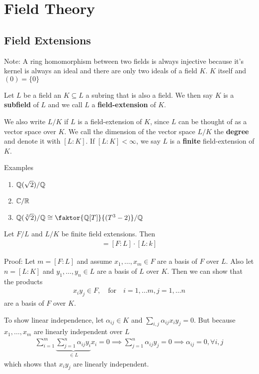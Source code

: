 \section{Field Theory}
\subsection{Field Extensions}
Note: A ring homomorphism between two fields is always injective because it's kernel is always an ideal and there are only two ideals of a field $K$.
$K$ itself and $(0) = \{0\}$

\begin{definition}[]
	Let $L$ be a field an $K \subseteq L$ a subring that is also a field. We then say $K$ is a \textbf{subfield} of $L$ and we call $L$ a \textbf{field-extension} of $K$.

	We also write $L/K$ if $L$ is a field-extension of $K$, since $L$ can be thought of as a vector space over $K$. We call the dimension of the vector space $L/K$ the \textbf{degree} and denote it with $[L:K]$. 
	If $[L:K] < \infty$, we say $L$ is a \textbf{finite} field-extension of $K$.
\end{definition}


Examples
\begin{enumerate}
	\item $\mathbb{Q}(\sqrt{2})/\mathbb{Q}$
	\item $\mathbb{C}/\mathbb{R}$
	\item $\Q(\sqrt[3]{2})/\Q \iso \faktor{\Q[T]}{(T^3 - 2)}/\Q$
\end{enumerate}


\begin{lemma}
Let $F/L$ and $L/K$ be finite field extensions. Then
\begin{align*}
	[F:K] = [F:L] \cdot [L:k]
\end{align*}
\end{lemma}
Proof: Let $m = [F:L]$ and assume $x_{1}, \ldots, x_{m} \in F$ are a basis of $F$ over $L$. 
Also let $n = [L:K]$ and $y_{1}, \ldots, y_{n} \in L$ are a basis of $L$ over $K$.
Then we can show that the products
\begin{align*}
	x_iy_j \in F, \quad \text{for} \quad i = 1, \ldots m, j = 1, \ldots n
\end{align*}
are a basis of $F$ over $K$.

To show linear independence, let $\alpha_{ij} \in K$ and $\sum_{i,j}\alpha_{ij}x_iy_j = 0$. But because $x_{1}, \ldots, x_{m}$ are linearly independent over $L$
\begin{align*}
	\sum_{i=1}^{m}\underbrace{\sum_{j=1}^{n}\alpha_{ij}y_i}_{\in L}x_i = 0 \implies \sum_{j=1}^{n}\alpha_{ij}y_j = 0 \implies \alpha_{ij} = 0, \forall i,j
\end{align*}
which shows that $x_iy_j$ are linearly independent.

